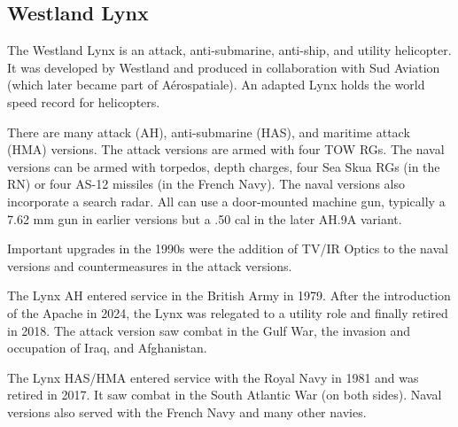 \subsection{Westland Lynx}

The Westland Lynx is an attack, anti-submarine, anti-ship, and utility helicopter. It was developed by Westland and produced in collaboration with Sud Aviation (which later became part of Aérospatiale). An adapted Lynx holds the world speed record for helicopters.

There are many attack (AH), anti-submarine (HAS), and maritime attack (HMA) versions. The attack versions are armed with four TOW RGs. The naval versions can be armed with torpedos, depth charges, four Sea Skua RGs (in the RN) or four AS-12 missiles (in the French Navy). The naval versions also incorporate a search radar. All can use a door-mounted machine gun, typically a 7.62 mm gun in earlier versions but a .50 cal in the later AH.9A variant.

Important upgrades in the 1990s were the addition of TV/IR Optics to the naval versions and countermeasures in the attack versions.

The Lynx AH entered service in the British Army in 1979. After the introduction of the Apache in 2024, the Lynx was relegated to a utility role and finally retired in 2018. The attack version saw combat in the Gulf War, the invasion and occupation of Iraq, and Afghanistan. 

The Lynx HAS/HMA entered service with the Royal Navy in 1981 and was retired in 2017. It saw combat in the South Atlantic War (on both sides). Naval versions also served with the French Navy and many other navies.